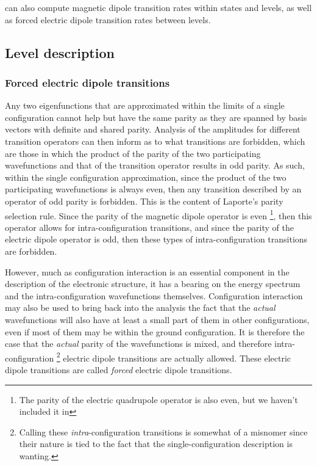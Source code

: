 \documentclass[11pt, twoside,openright]{article}
\begin{document}
\qlanth can also compute magnetic dipole transition rates within states and levels, as well as forced electric dipole transition rates between levels.

\subsection{Level description}

\subsubsection{Forced electric dipole transitions}

Any two eigenfunctions that are approximated within the limits of a single configuration cannot help but have the same parity as they are spanned by basis vectors with definite and shared parity. Analysis of the amplitudes for different transition operators can then inform as to what transitions are forbidden, which are those in which the product of the parity of the two participating wavefunctions and that of the transition operator results in odd parity. As such, within the single configuration approximation, since the product of the two participating wavefunctions is always even, then any transition described by an operator of odd parity is forbidden. This is the content of  Laporte's parity selection rule. Since the parity of the magnetic dipole operator is even \footnote{The parity of the electric quadrupole operator is also even, but we haven't included it in \qlanth}, then this operator allows for  intra-configuration transitions, and since the parity of the electric dipole operator is odd, then these types of intra-configuration transitions are forbidden.

However, much as configuration interaction is an essential component in the description of the electronic structure, it has a bearing on the energy spectrum and the intra-configuration wavefunctions themselves. Configuration interaction may also be used to bring back into the analysis the fact that the \textit{actual} wavefunctions will also have at least a small part of them in other configurations, even if most of them may be within the ground configuration. It is therefore the case that the \textit{actual} parity of the wavefunctions is mixed, and therefore intra-configuration  \footnote{Calling these \textit{intra}-configuration transitions is somewhat of a misnomer since their nature is tied to the fact that the single-configuration description is wanting.} electric dipole transitions are actually allowed. These electric dipole transitions are called \textit{forced} electric dipole transitions.
\end{document}
